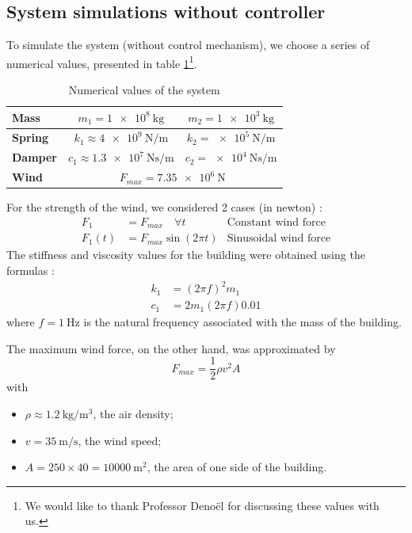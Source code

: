 \subsection{System simulations without controller}
To simulate the system (without control mechanism), we choose a series of numerical values, presented in table \ref{tab:numerical_values}\footnote{We would like to thank Professor Denoël for discussing these values with us.}.
\begin{table}[H]
    \centering
    \begin{tabular}{|l|c|c|}
        \hline
        {\bf Mass} & $m_1 = \SI{1e8}{\kilogram}$ & $m_2 = \SI{1e3}{\kilogram}$\\ \hline
        {\bf Spring} & $k_1 \approx \SI{4e9}{\newton/\meter}$ & $k_2 = \SI{e5}{\newton/\meter}$\\ \hline
        {\bf Damper} & $c_1 \approx \SI{1.3e7}{\newton\second/\meter}$ & $c_2 = \SI{e4}{\newton\second/\meter}$\\ \hline
        {\bf Wind} & \multicolumn{2}{c|}{$F_{max} = \SI{7.35e6}{\newton}$}\\ \hline
    \end{tabular}
    \caption{Numerical values of the system}
    \label{tab:numerical_values}
\end{table}
For the strength of the wind, we considered 2 cases (in newton) :
\begin{align*}
    F_1 &= F_{max}\quad\forall t & \text{Constant wind force}\\
    F_1(t) &= F_{max}\sin(2\pi t) & \text{Sinusoidal wind force}
\end{align*}
The stiffness and viscosity values for the building were obtained using the formulas :
\begin{align*}
    k_1 &= (2\pi f)^2m_1\\
    c_1 &= 2m_1(2\pi f)0.01
\end{align*}
where $f = \SI{1}{\hertz}$ is the natural frequency associated with the mass of the building.\par
The maximum wind force, on the other hand, was approximated by
\begin{equation*}
    F_{max} = \frac{1}{2}\rho v^2A
\end{equation*}
with
\begin{itemize}
    \item $\rho \approx \SI{1.2}{\kilogram/\meter\cubed}$, the air density;
    \item $v = \SI{35}{\meter/\second}$, the wind speed;
    \item $A = 250\times 40 = \SI{10000}{\meter\squared}$, the area of one side of the building.
\end{itemize}
